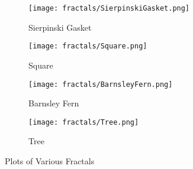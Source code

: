 \begin{figure}[tbh]
\begin{center}
	\begin{subfigure}[tbh]{0.475\textwidth}
	\begin{center}
	\texttt{[image: fractals/SierpinskiGasket.png]}
	\caption{ Sierpinski Gasket }
	\end{center}
	\end{subfigure}
\hfill
	\begin{subfigure}[tbh]{0.475\textwidth}
	\begin{center}
	\texttt{[image: fractals/Square.png]}
	\caption{ Square }
	\end{center}
	\end{subfigure}
\hfill
	\begin{subfigure}[tbh]{0.475\textwidth}
	\begin{center}
	\texttt{[image: fractals/BarnsleyFern.png]}
	\caption{ Barnsley Fern }
	\end{center}
	\end{subfigure}
\hfill
	\begin{subfigure}[tbh]{0.475\textwidth}
	\begin{center}
	\texttt{[image: fractals/Tree.png]}
	\caption{ Tree }
	\end{center}
	\end{subfigure}
\hfill

\end{center}
\caption{Plots of Various Fractals \label{fractals} }
\end{figure}

